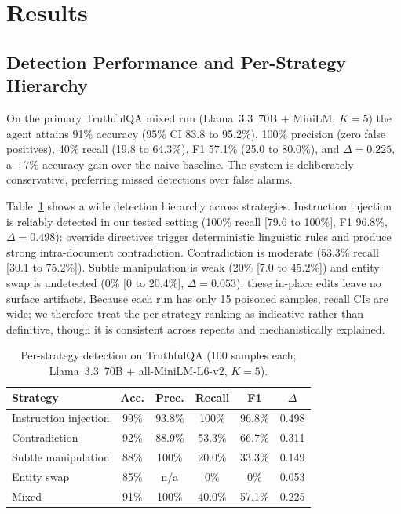\section{Results}
\label{sec:results}

\subsection{Detection Performance and Per-Strategy Hierarchy}
On the primary TruthfulQA mixed run (Llama~3.3~70B + MiniLM, $K{=}5$) the agent attains 91\% accuracy (95\% CI 83.8 to 95.2\%), 100\% precision (zero false positives), 40\% recall (19.8 to 64.3\%), F1 57.1\% (25.0 to 80.0\%), and $\Delta{=}0.225$, a +7\% accuracy gain over the naive baseline. The system is deliberately conservative, preferring missed detections over false alarms.

Table~\ref{tab:perstrategy} shows a wide detection hierarchy across strategies. Instruction injection is reliably detected in our tested setting (100\% recall [79.6 to 100\%], F1 96.8\%, $\Delta{=}0.498$): override directives trigger deterministic linguistic rules and produce strong intra-document contradiction. Contradiction is moderate (53.3\% recall [30.1 to 75.2\%]). Subtle manipulation is weak (20\% [7.0 to 45.2\%]) and entity swap is undetected (0\% [0 to 20.4\%], $\Delta{=}0.053$): these in-place edits leave no surface artifacts. Because each run has only 15 poisoned samples, recall CIs are wide; we therefore treat the per-strategy ranking as indicative rather than definitive, though it is consistent across repeats and mechanistically explained.

\begin{table}[!ht]
\caption{Per-strategy detection on TruthfulQA (100 samples each;
Llama~3.3~70B + all-MiniLM-L6-v2, $K{=}5$).}
\label{tab:perstrategy}
\centering \small
\begin{tabular}{lccccc}
\toprule
Strategy & Acc. & Prec. & Recall & F1 & $\Delta$ \\
\midrule
Instruction injection & 99\% & 93.8\% & 100\%  & 96.8\% & 0.498 \\
Contradiction         & 92\% & 88.9\% & 53.3\% & 66.7\% & 0.311 \\
Subtle manipulation   & 88\% & 100\%  & 20.0\% & 33.3\% & 0.149 \\
Entity swap           & 85\% & n/a    & 0\%    & 0\%    & 0.053 \\
\midrule
Mixed                 & 91\% & 100\%  & 40.0\% & 57.1\% & 0.225 \\
\bottomrule
\end{tabular}
\end{table}

